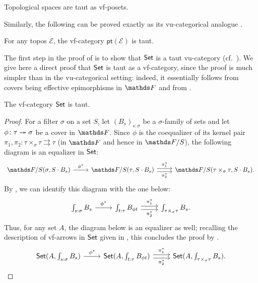 \begin{lem}\label{lem:top-spaces-are-taut}
    Topological spaces are taut as vf-posets.
\end{lem}

Similarly, the following can be proved exactly as its vu-categorical analogue \cite[Prop.\ 1.10]{saadiaGeometricMorphismsVirtual2026}.

\begin{prop}
    For any topos $\mathcal E$, the vf-category $\mathsf{pt}(\mathcal E)$ is taut.
\end{prop}

The first step in the proof of \cite[Prop.\ 1.10]{saadiaGeometricMorphismsVirtual2026} is to show that $\mathsf{Set}$ is a taut vu-category (cf.\ \cite[Lem.\ 1.9]{saadiaGeometricMorphismsVirtual2026}). We give here a direct proof that $\mathsf{Set}$ is taut as a vf-category, since the proof is much simpler than in the vu-categorical setting: indeed, it essentially follows from covers being effective epimorphisms in $\FF$ and from .

\begin{prop}\label{lem:set-is-taut}
    The vf-category $\mathsf{Set}$ is taut.
\end{prop}
\begin{proof}
    For a filter $\sigma$ on a set $S$, let $(B_s)_{s:\sigma}$ be a $\sigma$-family of sets and let $\phi \colon \tau \twoheadrightarrow \sigma$ be a cover in $\FF$. Since $\phi$ is the coequalizer of its kernel pair $\pi_1,\pi_2 \colon \tau\times_\sigma\tau \rightrightarrows \tau$ (in $\FF$ and hence in $\FF/S$), the following diagram is an equalizer in $\mathsf{Set}$:
\[\begin{tikzcd}
	{\FF/S(\sigma, S\cdot B_s) } & {\FF/S(\tau, S\cdot B_s) } & {\FF/S(\tau\times_\sigma\tau, S\cdot B_s). }
	\arrow["{\phi^*}", from=1-1, to=1-2]
	\arrow["{\pi_1^*}", shift left, from=1-2, to=1-3]
	\arrow["{\pi_2^*}"', shift right, from=1-2, to=1-3]
\end{tikzcd}\]
    By , we can identify this diagram with the one below:
\[\begin{tikzcd}
	{\int_{s:\sigma} B_s} & {\int_{t:\tau} B_{\phi t}} & {\int_{\tau\times_\sigma\tau} B_s.}
	\arrow["{\phi^*}", from=1-1, to=1-2]
	\arrow["{\pi_1^*}", shift left, from=1-2, to=1-3]
	\arrow["{\pi_2^*}"', shift right, from=1-2, to=1-3]
\end{tikzcd}\]
    Thus, for any set $A$, the diagram below is an equalizer as well; recalling the description of vf-arrows in $\mathsf{Set}$ given in , this concludes the proof by . 
    \[\begin{tikzcd}
	{\Set(A,\int_{s:\sigma} B_s)} & {\Set(A,\int_{t:\tau} B_{\phi t})} & {\Set(A,\int_{\tau\times_\sigma\tau} B_s).}
	\arrow["{\phi^*}", from=1-1, to=1-2]
	\arrow["{\pi_1^*}", shift left, from=1-2, to=1-3]
	\arrow["{\pi_2^*}"', shift right, from=1-2, to=1-3]
\end{tikzcd}\qedhere\]
\end{proof}

